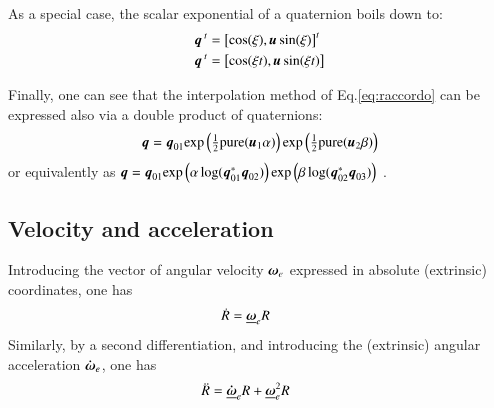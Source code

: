 As a special case, the scalar exponential of a quaternion boils down to:
\begin{align}
    \nonumber
        {\boldsymbol{q}}^{\:t} &= \left[ \cos(\xi),{\boldsymbol{u}}\sin(\xi) \right]^t \\ 
    \label{eq:at:quatpowd}
      {\boldsymbol{q}}^{\:t}  &= \left[ \cos(\xi t),{\boldsymbol{u}}\sin(\xi t) \right]
\end{align}

Finally, one can see that the interpolation method of Eq.\ref{eq:raccordo} can be expressed also via a double product of quaternions:
\begin{align}
        {\boldsymbol{q}} = {\boldsymbol{q}}_{01}
        \mathrm{exp} \left( \tfrac{1}{2} \text{pure}({\boldsymbol{u}}_1 \alpha) \right)
        \mathrm{exp} \left( \tfrac{1}{2} \text{pure}({\boldsymbol{u}}_2 \beta) \right)
         \label{eq:at:raccordo_quaternioni}
\end{align}
or equivalently as 
${\boldsymbol{q}} = {\boldsymbol{q}}_{01}
\mathrm{exp} \left( \alpha \, \mathrm{log}({\boldsymbol{q}}_{01}^* {\boldsymbol{q}}_{02})  \right)
\mathrm{exp} \left( \beta \, \mathrm{log}({\boldsymbol{q}}_{02}^* {\boldsymbol{q}}_{03})  \right)
$
.

\subsection{Velocity and acceleration} 
Introducing the vector of angular velocity ${\boldsymbol{\omega}}_e$ expressed in absolute (extrinsic) coordinates, one has
\begin{align}
\dot{R} = \underline{{\boldsymbol{\omega}}}_e R\qquad
\label{eq:Adot}
\end{align}
Similarly, by a second differentiation, and introducing the (extrinsic) angular acceleration ${\boldsymbol{\dot{\omega}}}_e$, one has
\begin{align}
\ddot{R}=\underline{{\boldsymbol{\dot{\omega}}}}_e R+\underline{{\boldsymbol{\omega}}}^2_e R\qquad
\label{eq:Adotdot}
\end{align}

